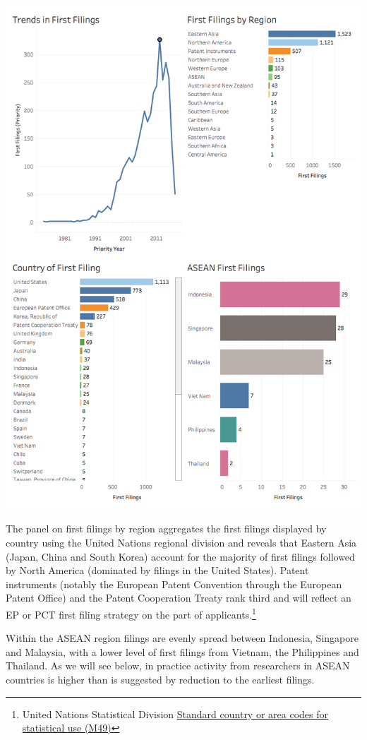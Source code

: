 \documentclass[]{book}
\theoremstyle{definition}
\theoremstyle{definition}
\theoremstyle{definition}
\theoremstyle{remark}
\begin{document}
\includegraphics[width=11.49in]{images-patents/first_filings}

The panel on first filings by region aggregates the first filings
displayed by country using the United Nations regional division and
reveals that Eastern Asia (Japan, China and South Korea) account for the
majority of first filings followed by North America (dominated by
filings in the United States). Patent instruments (notably the European
Patent Convention through the European Patent Office) and the Patent
Cooperation Treaty rank third and will reflect an EP or PCT first filing
strategy on the part of applicants.\footnote{United Nations Statistical
  Division \href{https://unstats.un.org/unsd/methodology/m49/}{Standard
  country or area codes for statistical use (M49)}}

Within the ASEAN region filings are evenly spread between Indonesia,
Singapore and Malaysia, with a lower level of first filings from
Vietnam, the Philippines and Thailand. As we will see below, in practice
activity from researchers in ASEAN countries is higher than is suggested
by reduction to the earliest filings.
\end{document}
